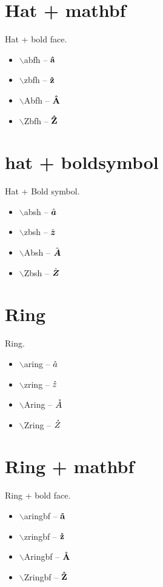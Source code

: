 \documentclass[twocolumn, a4paper]{article}
\begin{document}
	\section{Hat + mathbf}
	Hat + bold face.
	\begin{itemize} 
		\item $\backslash$abfh -- $\mathbf{\hat a}$
		\item $\backslash$zbfh -- $\mathbf{\hat z}$  
		\item $\backslash$Abfh -- $\mathbf{\hat A}$
		\item $\backslash$Zbfh -- $\mathbf{\hat Z}$  
	\end{itemize}



	\section{hat + boldsymbol}
	Hat + Bold symbol.
	\begin{itemize} 
		\item $\backslash$absh -- $\hat{\boldsymbol{a}}$
		\item $\backslash$zbsh -- $\hat{\boldsymbol{z}}$  
		\item $\backslash$Absh -- $\hat{\boldsymbol{A}}$
		\item $\backslash$Zbsh -- $\hat{\boldsymbol{Z}}$  
	\end{itemize}

	

	


	\section{Ring}
	Ring.
	\begin{itemize} 
		\item $\backslash$aring -- $\mathring{a}$
		\item $\backslash$zring -- $\mathring{z}$  
		\item $\backslash$Aring -- $\mathring{A}$
		\item $\backslash$Zring -- $\mathring{Z}$  
	\end{itemize}

	\section{Ring + mathbf}
	Ring + bold face.
	\begin{itemize} 
		\item $\backslash$aringbf -- $\mathbf{\mathring{a}}$
		\item $\backslash$zringbf -- $\mathbf{\mathring{z}}$  
		\item $\backslash$Aringbf -- $\mathbf{\mathring{A}}$
		\item $\backslash$Zringbf -- $\mathbf{\mathring{Z}}$  
	\end{itemize}
\end{document}
